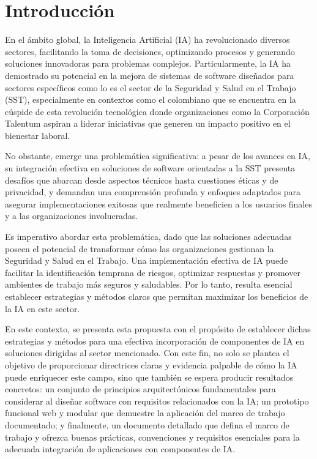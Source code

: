 \section{Introducción}

En el ámbito global, la Inteligencia Artificial (IA) ha revolucionado diversos sectores, facilitando la toma de decisiones, optimizando procesos y generando soluciones innovadoras para problemas complejos. Particularmente, la IA ha demostrado su potencial en la mejora de sistemas de software diseñados para sectores específicos como lo es el sector de la Seguridad y Salud en el Trabajo (SST), especialmente en contextos como el colombiano que se encuentra en la cúspide de esta revolución tecnológica donde organizaciones como la Corporación Talentum aspiran a liderar iniciativas que generen un impacto positivo en el bienestar laboral.

No obstante, emerge una problemática significativa: a pesar de los avances en IA, su integración efectiva en soluciones de software orientadas a la SST presenta desafíos que abarcan desde aspectos técnicos hasta cuestiones éticas y de privacidad, y demandan una comprensión profunda y enfoques adaptados para asegurar implementaciones exitosas que realmente beneficien a los usuarios finales y a las organizaciones involucradas.

Es imperativo abordar esta problemática, dado que las soluciones adecuadas poseen el potencial de transformar cómo las organizaciones gestionan la Seguridad y Salud en el Trabajo. Una implementación efectiva de IA puede facilitar la identificación temprana de riesgos, optimizar respuestas y promover ambientes de trabajo más seguros y saludables. Por lo tanto, resulta esencial establecer estrategias y métodos claros que permitan maximizar los beneficios de la IA en este sector.

En este contexto, se presenta esta propuesta con el propósito de establecer dichas estrategias y métodos para una efectiva incorporación de componentes de IA en soluciones dirigidas al sector mencionado. Con este fin, no solo se plantea el objetivo de proporcionar directrices claras y evidencia palpable de cómo la IA puede enriquecer este campo, sino que también se espera producir resultados concretos: un conjunto de principios arquitectónicos fundamentales para considerar al diseñar software con requisitos relacionados con la IA; un prototipo funcional web y modular que demuestre la aplicación del marco de trabajo documentado; y finalmente, un documento detallado que defina el marco de trabajo y ofrezca buenas prácticas, convenciones y requisitos esenciales para la adecuada integración de aplicaciones con componentes de IA.

